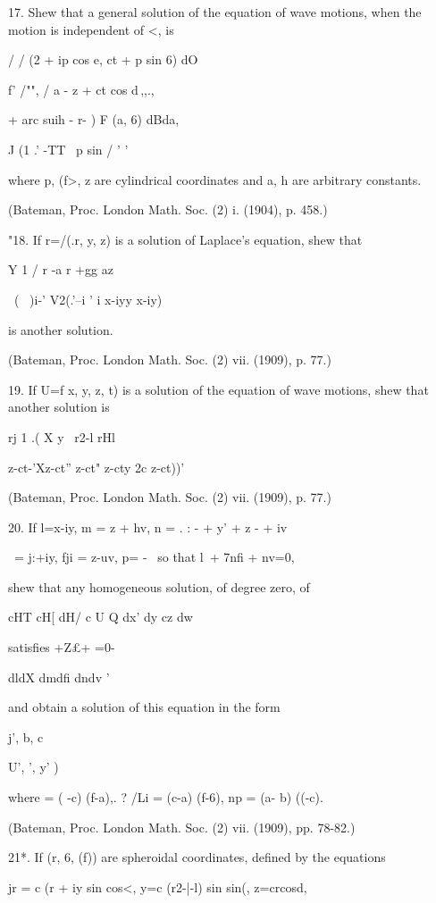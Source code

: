 17. Shew that a general solution of the equation of wave motions, when
the motion is independent of <, is

/ / (2 + ip cos e, ct + p sin 6) dO

f' /"", / a - z + ct cos d\,,,.,

+ arc suih - r- ) F (a, 6) dBda,

J (1 .' -TT \ p sin / ' '

where p, (f>, z are cylindrical coordinates and a, h are arbitrary
constants.

(Bateman, Proc. London Math. Soc. (2) i. (1904), p. 458.)

"18. If r=/(.r, y, z) is a solution of Laplace's equation, shew that

Y 1 / r -a r +gg az \

~( \, )i-' V2(.'--i ' i x-iyy x-iy)

is another solution.

(Bateman, Proc. London Math. Soc. (2) vii. (1909), p. 77.)

19. If U=f x, y, z, t) is a solution of the equation of wave motions,
shew that another solution is

rj 1 .( X y \ r2-l rHl \

z-ct-'Xz-ct'' z-ct" z-cty 2c z-ct))'

(Bateman, Proc. London Math. Soc. (2) vii. (1909), p. 77.)

20. If l=x-iy, m = z + hv, n = . : - + y' + z - + iv%

\ = j:+iy, fji = z-uv, p= - \, so that l\ + 7nfi + nv=0,

shew that any homogeneous solution, of degree zero, of

cHT cH[ dH/ c U Q dx' dy cz dw

satisfies +Z£+ =0-

dldX dmdfi dndv '

and obtain a solution of this equation in the form

j', b, c \

U', ', y' )

where = ( -c) (f-a),. ? /Li = (c-a) (f-6), np = (a- b) ((-c).

(Bateman, Proc. London Math. Soc. (2) vii. (1909), pp. 78-82.)

%
%

21*. If (r, 6, (f)) are spheroidal coordinates, defined by the
equations

jr = c (r + iy sin cos<, y=c (r2-|-l) sin sin(, z=crcosd,


